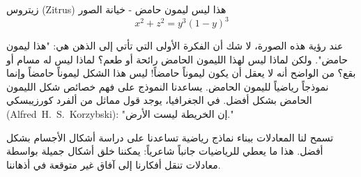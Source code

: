 \begin{surferPage}[زيتروس]{زيتروس (Zitrus)}
هذا ليس ليمون حامض - خيانة الصور\\
\smallskip
\[x^2 + z^2 = y^3 (1 - y)^3\]


\singlespacing
عند رؤية هذه الصورة، لا شك أن الفكرة الأولى التي تأتي إلى الذهن هي: "هذا ليمون حامض". ولكن لماذا ليس لهذا الليمون الحامض رائحة أو طعم؟ لماذا ليس له مسام أو بقع؟ من الواضح أنه لا يعقل أن يكون ليموناً حامضاً!
\singlespacing
ليس هذا الشكل ليموناً حامضاً وإنما نموذجاً رياضياً لليمون الحامض. يساعدنا النموذج على فهم خصائص شكل الليمون الحامض بشكل أفضل. في الجغرافيا، يوجد قول مماثل من ألفرد كورزيبسكي
\textenglish{\mbox{(Alfred\ H.\ S.\ Korzybski)}}: 
 "إن الخريطة ليست الأرض." \\
\singlespacing

تسمح لنا المعادلات ببناء نماذج رياضية تساعدنا على دراسة أشكال الأجسام بشكل أفضل.
\singlespacing
هذا ما يعطي للرياضيات جانباً شاعرياً: يمكننا خلق أشكال جميلة بواسطة معادلات تنقل أفكارنا إلى آفاق غير متوقعة في أذهاننا.
\end{surferPage}
